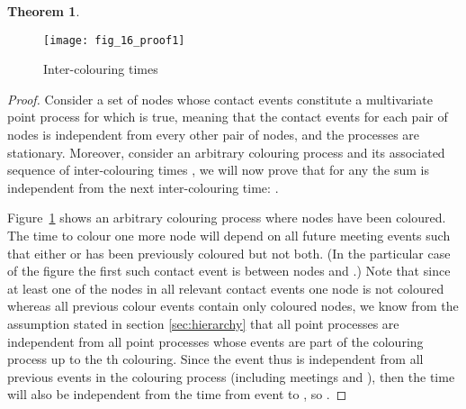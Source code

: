 \documentclass{article}
\newtheorem{theorem}{Theorem}
\begin{document}
\begin{theorem}
  
\end{theorem}
\begin{figure}[ht]
  \centering
  \texttt{[image: fig\_16\_proof1]}
  \caption{Inter-colouring times}
  \label{fig:inter-colouring}
\end{figure}
\begin{proof}
  Consider a set of nodes whose contact events constitute a
  multivariate point process for which  is true, meaning that the contact events for each pair of
  nodes is independent from every other pair of nodes, and the
  processes are stationary. Moreover, consider an arbitrary colouring
  process  and its associated sequence of inter-colouring
  times , we will now prove that for any 
  the sum  is independent from the
  next inter-colouring time: .

  Figure~\ref{fig:inter-colouring} shows an arbitrary colouring
  process where  nodes have been coloured. The time to colour one
  more node  will depend on all future meeting events
   such that either  or  has been previously coloured but
  not both. (In the particular case of the figure the first such
  contact event is between nodes  and .) Note that since at
  least one of the nodes in all relevant contact events  one
  node is not coloured whereas all previous colour events contain only
  coloured nodes, we know from the assumption  stated in
  section \ref{sec:hierarchy} that all point processes  are
  independent from all point processes whose events are part of the
  colouring process up to the th colouring. Since the event 
  thus is independent from all previous events in the colouring
  process (including meetings  and ), then the time
   will also be independent from the time from event 
  to , so .

\end{proof}
\end{document}
